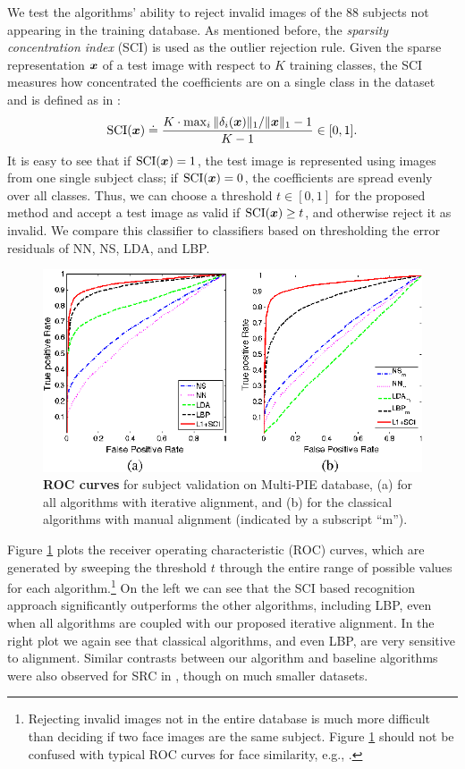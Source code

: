 \documentclass[10pt,journal,letterpaper,compsoc]{IEEEtran}
\begin{document}
We test the algorithms' ability to reject invalid images of the
88 subjects not appearing in the training database. As
mentioned before, the \emph{sparsity concentration index} (SCI)
is used as the outlier rejection rule. Given the sparse
representation ${\boldsymbol{x}}$ of a test image with respect to $K$
training classes, the SCI measures how concentrated the
coefficients are on a single class in the dataset and is
defined as in \cite{Wright2009-PAMI}:
\begin{displaymath}
\textup{SCI}({\boldsymbol{x}}) \doteq \frac{K \cdot \max_i \|\delta_i({\boldsymbol{x}})\|_1 /
\|{\boldsymbol{x}}\|_1 - 1}{K - 1} \in [0,1] .
\end{displaymath}
It is easy to see that if $\textup{SCI}({\boldsymbol{x}}) = 1$, the test
image is represented using images from one single subject
class; if $\textup{SCI}({\boldsymbol{x}}) = 0$, the coefficients are spread
evenly over all classes. Thus, we can choose a threshold $t \in
[0,1]$ for the proposed method and accept a test image as valid
if $\textup{SCI}({\boldsymbol{x}}) \geq t$, and otherwise reject it as
invalid. We compare this classifier to classifiers based on
thresholding the error residuals of NN, NS, LDA, and LBP.
\begin{figure}[t]
\includegraphics{Figure_11}
\vspace{-2mm}
\caption{{\bf ROC curves} for subject validation on Multi-PIE database,
(a) for all algorithms with iterative alignment, and
(b) for the classical algorithms with manual alignment (indicated by a subscript ``m'').}\label{fig:roc-multipie}
\vspace{0em}
\end{figure}

Figure \ref{fig:roc-multipie} plots the receiver operating
characteristic (ROC) curves, which are generated by sweeping
the threshold $t$ through the entire range of possible values
for each algorithm.\footnote{Rejecting invalid images not in
the entire database is much more difficult than deciding if two
face images are the same subject. Figure \ref{fig:roc-multipie}
should not be confused with typical ROC curves for face
similarity, e.g., \cite{PhillipsP2007}.} On the left we can see
that the SCI based recognition approach significantly
outperforms the other algorithms, including LBP, even when all
algorithms are coupled with our proposed iterative alignment.
In the right plot we again see that classical algorithms, and
even LBP, are very sensitive to alignment.  Similar contrasts
between our algorithm and baseline algorithms were also
observed for SRC in \cite{Wright2009-PAMI}, though on much
smaller datasets.
\end{document}
